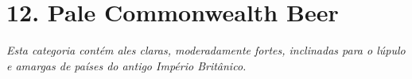\section*{12. Pale Commonwealth Beer}
\textit{Esta categoria contém ales claras, moderadamente fortes, inclinadas para o lúpulo e amargas de países do antigo Império Britânico.}
